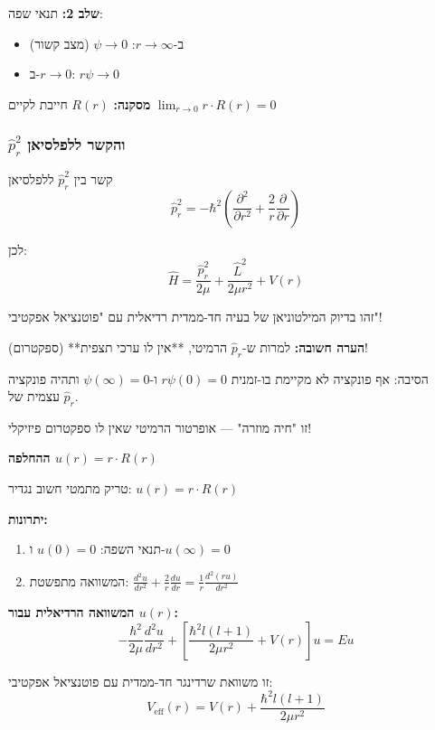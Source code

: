 \textbf{שלב 2:} תנאי שפה:
\begin{itemize}
    \item ב-$r \to \infty$: $\psi \to 0$ (מצב קשור)
    \item ב-$r \to 0$: $r\psi \to 0$
\end{itemize}

\textbf{מסקנה:} $R(r)$ חייבת לקיים $\lim_{r \to 0} r \cdot R(r) = 0$

\subsubsection{$\hat{p}_r^2$ והקשר ללפלסיאן}

\begin{theorembox}{קשר בין $\hat{p}_r^2$ ללפלסיאן}
\[
\hat{p}_r^2 = -\hbar^2\left(\frac{\partial^2}{\partial r^2} + \frac{2}{r}\frac{\partial}{\partial r}\right)
\]

לכן:
\[
\hat{H} = \frac{\hat{p}_r^2}{2\mu} + \frac{\hat{L}^2}{2\mu r^2} + V(r)
\]

זהו בדיוק המילטוניאן של בעיה חד-ממדית רדיאלית עם "פוטנציאל אפקטיבי"!
\end{theorembox}

\begin{notebox}
\textbf{הערה חשובה:} למרות ש-$\hat{p}_r$ הרמיטי, **אין לו ערכי תצפית** (ספקטרום)!

הסיבה: אף פונקציה לא מקיימת בו-זמנית $r\psi(0) = 0$ ו-$\psi(\infty) = 0$ ותהיה פונקציה עצמית של $\hat{p}_r$.

זו "חיה מוזרה" — אופרטור הרמיטי שאין לו ספקטרום פיזיקלי!
\end{notebox}

\textbf{ההחלפה $u(r) = r \cdot R(r)$}

\begin{importantbox}{טריק מתמטי חשוב}
נגדיר: $u(r) = r \cdot R(r)$

\textbf{יתרונות:}
\begin{enumerate}
    \item תנאי השפה: $u(0) = 0$ ו-$u(\infty) = 0$
    \item המשוואה מתפשטת: $\frac{d^2u}{dr^2} + \frac{2}{r}\frac{du}{dr} = \frac{1}{r}\frac{d^2(ru)}{dr^2}$
\end{enumerate}

\textbf{המשוואה הרדיאלית עבור $u(r)$:}
\[
-\frac{\hbar^2}{2\mu}\frac{d^2u}{dr^2} + \left[\frac{\hbar^2 l(l+1)}{2\mu r^2} + V(r)\right]u = E u
\]

זו משוואת שרדינגר חד-ממדית עם פוטנציאל אפקטיבי:
\[
V_{\text{eff}}(r) = V(r) + \frac{\hbar^2 l(l+1)}{2\mu r^2}
\]
\end{importantbox}

